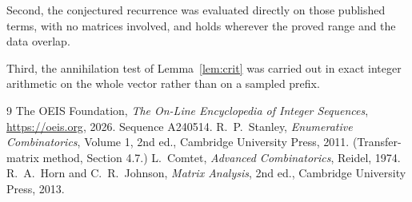 \documentclass[11pt,a4paper]{article}
\theoremstyle{plain}
\theoremstyle{definition}
\begin{document}
Second, the conjectured recurrence was evaluated directly on those published terms, with no
matrices involved, and holds wherever the proved range and the data overlap.

Third, the annihilation test of Lemma~\ref{lem:crit} was carried out in exact integer
arithmetic on the whole vector rather than on a sampled prefix.

\begin{thebibliography}{9}
 The OEIS Foundation, \emph{The On-Line Encyclopedia of Integer
Sequences}, \url{https://oeis.org}, 2026. Sequence A240514.
 R.~P.~Stanley, \emph{Enumerative Combinatorics}, Volume 1, 2nd ed.,
Cambridge University Press, 2011. (Transfer-matrix method, Section 4.7.)
 L.~Comtet, \emph{Advanced Combinatorics}, Reidel, 1974.
 R.~A.~Horn and C.~R.~Johnson, \emph{Matrix Analysis}, 2nd ed., Cambridge
University Press, 2013.
\end{thebibliography}
\end{document}
